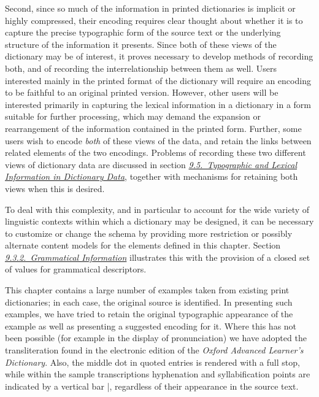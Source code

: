 Second, since so much of the information in printed dictionaries is implicit or highly compressed, their encoding requires clear thought about whether it is to capture the precise typographic form of the source text or the underlying structure of the information it presents. Since both of these views of the dictionary may be of interest, it proves necessary to develop methods of recording both, and of recording the interrelationship between them as well. Users interested mainly in the printed format of the dictionary will require an encoding to be faithful to an original printed version. However, other users will be interested primarily in capturing the lexical information in a dictionary in a form suitable for further processing, which may demand the expansion or rearrangement of the information contained in the printed form. Further, some users wish to encode \textit{both} of these views of the data, and retain the links between related elements of the two encodings. Problems of recording these two different views of dictionary data are discussed in section \textit{\hyperref[DIMV]{9.5.\ Typographic and Lexical Information in Dictionary Data}}, together with mechanisms for retaining both views when this is desired.\par
To deal with this complexity, and in particular to account for the wide variety of linguistic contexts within which a dictionary may be designed, it can be necessary to customize or change the schema by providing more restriction or possibly alternate content models for the elements defined in this chapter. Section \textit{\hyperref[DITPGR]{9.3.2.\ Grammatical Information}} illustrates this with the provision of a closed set of values for grammatical descriptors.\par
This chapter contains a large number of examples taken from existing print dictionaries; in each case, the original source is identified. In presenting such examples, we have tried to retain the original typographic appearance of the example as well as presenting a suggested encoding for it. Where this has not been possible (for example in the display of pronunciation) we have adopted the transliteration found in the electronic edition of the \textit{Oxford Advanced Learner's Dictionary}. Also, the middle dot in quoted entries is rendered with a full stop, while within the sample transcriptions hyphenation and syllabification points are indicated by a vertical bar |, regardless of their appearance in the source text.
